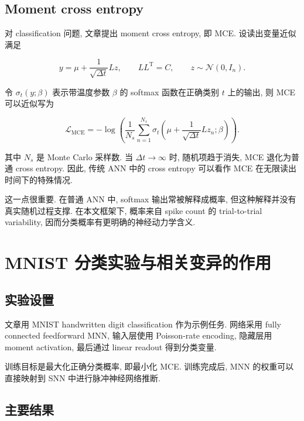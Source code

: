 \documentclass[oneside]{ctexart}
\begin{document}
\subsection{Moment cross entropy}

对 classification 问题, 文章提出 moment cross entropy, 即 MCE. 设读出变量近似满足

\begin{equation}
    y
    =
    \mu+\dfrac{1}{\sqrt{\Delta t}}Lz,
    \qquad
    LL^{\mathrm T}=C,
    \qquad
    z\sim\mathcal{N}(0,I_n).
\end{equation}

令 $\sigma_t(y;\beta)$ 表示带温度参数 $\beta$ 的 softmax 函数在正确类别 $t$ 上的输出, 则 MCE 可以近似写为

\begin{equation}
    \mathcal{L}_{\mathrm{MCE}}
    =
    -\log
    \left(
        \dfrac{1}{N_s}
        \sum\limits_{n=1}^{N_s}
        \sigma_t
        \left(
            \mu+\dfrac{1}{\sqrt{\Delta t}}Lz_n;\beta
        \right)
    \right).
\end{equation}

其中 $N_s$ 是 Monte Carlo 采样数. 当 $\Delta t\to\infty$ 时, 随机项趋于消失, MCE 退化为普通 cross entropy. 因此, 传统 ANN 中的 cross entropy 可以看作 MCE 在无限读出时间下的特殊情况.

这一点很重要. 在普通 ANN 中, softmax 输出常被解释成概率, 但这种解释并没有真实随机过程支撑. 在本文框架下, 概率来自 spike count 的 trial-to-trial variability, 因而分类概率有更明确的神经动力学含义.

\section{MNIST 分类实验与相关变异的作用}

\subsection{实验设置}

文章用 MNIST handwritten digit classification 作为示例任务. 网络采用 fully connected feedforward MNN, 输入层使用 Poisson-rate encoding, 隐藏层用 moment activation, 最后通过 linear readout 得到分类变量.

训练目标是最大化正确分类概率, 即最小化 MCE. 训练完成后, MNN 的权重可以直接映射到 SNN 中进行脉冲神经网络推断.

\subsection{主要结果}
\end{document}
